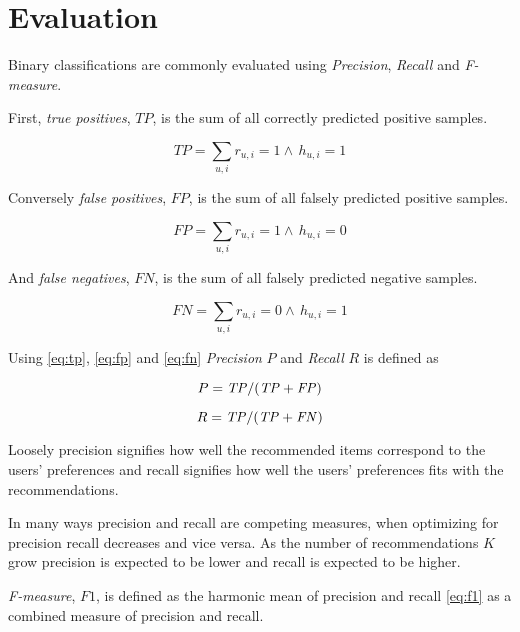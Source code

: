 
\newpage
\section{Evaluation}\label{sec:eval}

Binary classifications are commonly evaluated using \textit{Precision}, \textit{Recall} and \textit{F-measure}.

First, \textit{true positives}, $TP$, is the sum of all correctly predicted positive samples.

\begin{equation} \label{eq:tp}
    TP = \sum_{u, i} r_{u, i} = 1 \land \, h_{u, i} = 1
\end{equation}

Conversely \textit{false positives}, $FP$, is the sum of all falsely predicted positive samples.

\begin{equation} \label{eq:fp}
    FP = \sum_{u, i} r_{u, i} = 1 \land \, h_{u, i} = 0
\end{equation}

And \textit{false negatives}, $FN$, is the sum of all falsely predicted negative samples.

\begin{equation} \label{eq:fn}
    FN = \sum_{u, i} r_{u, i} = 0 \land \, h_{u, i} = 1
\end{equation}

Using \eqref{eq:tp}, \eqref{eq:fp} and \eqref{eq:fn} \textit{Precision} $P$ and \textit{Recall} $R$ is defined as

\begin{equation} \label{eq:precision}
    P = \mathit{TP} / (\mathit{TP} + \mathit{FP})
\end{equation}

\begin{equation} \label{eq:recall}
    R = \mathit{TP} / (\mathit{TP} + \mathit{FN})
\end{equation}

Loosely precision signifies how well the recommended items correspond to the users' preferences and recall signifies how well the users' preferences fits with the recommendations.  

In many ways precision and recall are competing measures, when optimizing for precision recall decreases and vice versa.  As the number of recommendations $K$ grow precision is expected to be lower and recall is expected to be higher. \citep{hu2008collaborative}


\textit{F-measure}, $\mathit{F1}$, is defined as the harmonic mean of precision and recall \eqref{eq:f1} as a combined measure of precision and recall.

